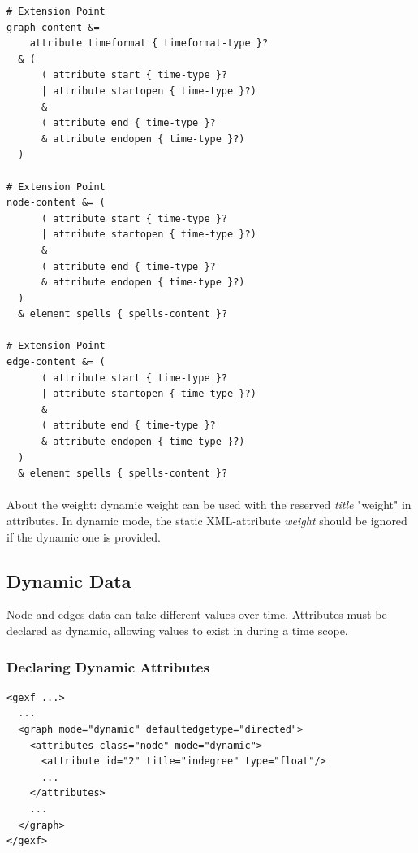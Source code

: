 \documentclass[a4paper,10pt]{article}
\begin{document}
\lstset{ style=rnc }
\begin{lstlisting}[caption={Dynamic Topology Specification},label=dyntopoRNC]
# Extension Point
graph-content &=
    attribute timeformat { timeformat-type }?
  & (
      ( attribute start { time-type }?
      | attribute startopen { time-type }?)
      &
      ( attribute end { time-type }?
      & attribute endopen { time-type }?)
  )

# Extension Point
node-content &= (
      ( attribute start { time-type }?
      | attribute startopen { time-type }?)
      &
      ( attribute end { time-type }?
      & attribute endopen { time-type }?)
  )
  & element spells { spells-content }?

# Extension Point
edge-content &= (
      ( attribute start { time-type }?
      | attribute startopen { time-type }?)
      &
      ( attribute end { time-type }?
      & attribute endopen { time-type }?)
  )
  & element spells { spells-content }?
\end{lstlisting}

\paragraph{}
About the weight: dynamic weight can be used with the reserved \textit{title} "weight" in attributes. In dynamic mode, the static XML-attribute \textit{weight} should be ignored if the dynamic one is provided.

\subsection{Dynamic Data}

Node and edges data can take different values over time. Attributes must be declared as dynamic, allowing values to exist in during a time scope.

\subsubsection{Declaring Dynamic Attributes}

\lstset{ style=gexf }
\begin{lstlisting}[caption={Indegree may change over time!}]
<gexf ...>
  ...
  <graph mode="dynamic" defaultedgetype="directed">
    <attributes class="node" mode="dynamic">
      <attribute id="2" title="indegree" type="float"/>
      ...
    </attributes>
    ...
  </graph>
</gexf>
\end{lstlisting}
\end{document}
